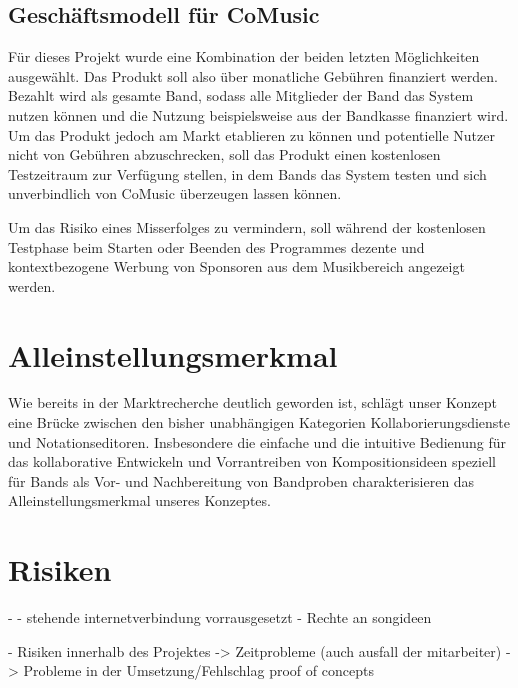 \documentclass[12pt]{scrartcl}
\begin{document}
\subsection{Geschäftsmodell für CoMusic}

Für dieses Projekt wurde eine Kombination der beiden letzten Möglichkeiten ausgewählt. Das Produkt soll also über monatliche Gebühren finanziert werden. Bezahlt wird als gesamte Band, sodass alle Mitglieder der Band das System nutzen können und die Nutzung beispielsweise aus der Bandkasse finanziert wird. Um das Produkt jedoch am Markt etablieren zu können und potentielle Nutzer nicht von Gebühren abzuschrecken, soll das Produkt einen kostenlosen Testzeitraum zur Verfügung stellen, in dem Bands das System testen und sich unverbindlich von CoMusic überzeugen lassen können.

Um das Risiko eines Misserfolges zu vermindern, soll während der kostenlosen Testphase beim Starten oder Beenden des Programmes dezente und kontextbezogene Werbung von Sponsoren aus dem Musikbereich angezeigt werden.



\section{Alleinstellungsmerkmal}

Wie bereits in der Marktrecherche deutlich geworden ist, schlägt unser Konzept eine Brücke zwischen den bisher unabhängigen Kategorien Kollaborierungsdienste und Notationseditoren. Insbesondere die einfache und die intuitive Bedienung für das kollaborative Entwickeln und Vorrantreiben von Kompositionsideen speziell für Bands als Vor- und Nachbereitung von Bandproben charakterisieren das Alleinstellungsmerkmal unseres Konzeptes.


\section{Risiken}


- 
- stehende internetverbindung vorrausgesetzt
- Rechte an songideen


- Risiken innerhalb des Projektes
-> Zeitprobleme (auch ausfall der mitarbeiter)
-> Probleme in der Umsetzung/Fehlschlag proof of concepts
\end{document}
